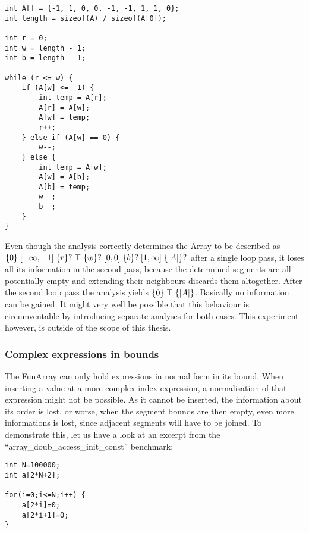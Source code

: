 \vspace{2mm}
\begin{center}
\begin{BVerbatim}
int A[] = {-1, 1, 0, 0, -1, -1, 1, 1, 0};
int length = sizeof(A) / sizeof(A[0]);

int r = 0;
int w = length - 1;
int b = length - 1;

while (r <= w) {
    if (A[w] <= -1) {
        int temp = A[r];
        A[r] = A[w];
        A[w] = temp;
        r++;
    } else if (A[w] == 0) {
        w--;
    } else {
        int temp = A[w];
        A[w] = A[b];
        A[b] = temp;
        w--;
        b--;
    }
}
\end{BVerbatim}
\end{center}
 
\noindent Even though the analysis correctly determines the Array to be described as $\{0\} \;[-\infty, -1]\; \{r\}? \;\top\; \{w\}? \;[0, 0]\; \{b\}? \;[1, \infty]\;  \{|A|\}?$ after a single loop pass, it loses all its information in the second pass, because the determined segments are all potentially empty and extending their neighbours discards them altogether. After the second loop pass the analysis yields $\{0\} \;\top\; \{|A|\}$. Basically no information can be gained. It might very well be possible that this behaviour is circumventable by introducing separate analyses for both cases. This experiment however, is outside of the scope of this thesis.
 
\subsubsection{Complex expressions in bounds}

The FunArray can only hold expressions in normal form in its bound. When inserting a value at a more complex index expression, a normalisation of that expression might not be possible. As it cannot be inserted, the information about its order is lost, or worse, when the segment bounds are then empty, even more informations is lost, since adjacent segments will have to be joined. To demonstrate this, let us have a look at an excerpt from the ``array\_doub\_access\_init\_\allowbreak{}const'' benchmark:


\begin{adjustbox}{center}
\begin{lstlisting}
int N=100000;
int a[2*N+2];

for(i=0;i<=N;i++) {
    a[2*i]=0;
    a[2*i+1]=0;
}
\end{lstlisting}
\end{adjustbox}
\vspace{2mm}

